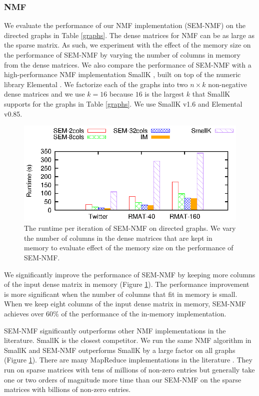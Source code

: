 \subsubsection{NMF}
We evaluate the performance of our NMF implementation (SEM-NMF) on the directed
graphs in Table \ref{graphs}. The dense matrices for NMF can be as large as
the sparse matrix. As such, we experiment with the effect of the memory size on
the performance of SEM-NMF by varying the number of columns in memory from
the dense matrices. We also compare the performance of SEM-NMF with
a high-performance NMF implementation SmallK \cite{SmallK}, built on top of
the numeric library Elemental \cite{elemental}. We factorize
each of the graphs into two $n \times k$ non-negative dense matrices and
we use $k=16$ because $16$ is the largest $k$ that SmallK supports for
the graphs in Table \ref{graphs}. We use SmallK v1.6 and Elemental v0.85.

\begin{figure}
	\begin{center}
		\footnotesize
		\includegraphics[scale=1]{SpMM_figs/NMF.eps}
		\caption{The runtime per iteration of SEM-NMF on directed graphs.
			We vary the number of columns in the dense matrices that are kept
			in memory to evaluate effect of the memory size on the performance
		of SEM-NMF.}
		\label{perf:NMF}
	\end{center}
\end{figure}

We significantly improve the performance of SEM-NMF by keeping more columns
of the input dense matrix in memory (Figure \ref{perf:NMF}). The performance
improvement is more significant when the number of columns that fit in memory
is small. When we keep eight columns of the input dense matrix in memory,
SEM-NMF achieves over 60\% of the performance of the in-memory implementation.

SEM-NMF significantly outperforms other NMF implementations in the literature.
SmallK is the closest competitor. We run the same NMF algorithm in SmallK and
SEM-NMF outperforms SmallK by a large factor on all graphs (Figure
\ref{perf:NMF}). There are many MapReduce implementations in
the literature \cite{Liao14, Yin14, Liu10}. They run on sparse
matrices with tens of millions of non-zero entries but generally take
one or two orders of magnitude more time than our SEM-NMF on the sparse matrices
with billions of non-zero entries.
